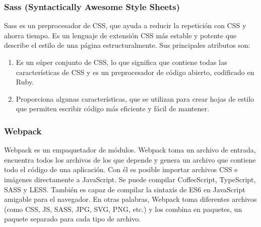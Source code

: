 \subsubsection{Sass (Syntactically Awesome Style Sheets)}
Sass es un preprocesador de CSS, que ayuda a reducir la repetición con CSS y ahorra tiempo. Es un lenguaje de extensión CSS más estable y potente que describe el estilo de una página estructuralmente. Sus principales atributos son:
\begin{enumerate}
  \item Es un súper conjunto de CSS, lo que significa que contiene todas las características de CSS y es un preprocesador de código abierto, codificado en Ruby.
  \item Proporciona algunas características, que se utilizan para crear hojas de estilo que permiten escribir código más eficiente y fácil de mantener.
\end{enumerate}
\subsubsection{Webpack}
Webpack es un empaquetador de módulos. Webpack toma un archivo de entrada, encuentra todos los archivos de los que depende y genera un archivo que contiene todo el código de una aplicación. Con él es posible importar archivos CSS e imágenes directamente a JavaScript. Se puede compilar CoffeeScript, TypeScript, SASS y LESS. También es capaz de compilar la sintaxis de ES6 en JavaScript amigable para el navegador. En otras palabras, Webpack toma diferentes archivos (como CSS, JS, SASS, JPG, SVG, PNG, etc.) y los combina en paquetes, un paquete separado para cada tipo de archivo.